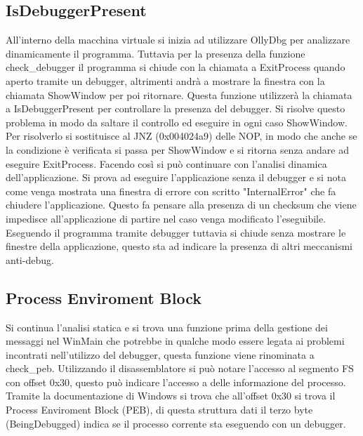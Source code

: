 \documentclass[a4paper,10pt]{article}
\begin{document}
\subsection{IsDebuggerPresent}
All'interno della macchina virtuale si inizia ad utilizzare OllyDbg per analizzare dinamicamente il programma. Tuttavia per la presenza della funzione check\_debugger il programma si chiude con la chiamata a ExitProcess quando aperto tramite un debugger, altrimenti andrà a mostrare la finestra con la chiamata ShowWindow per poi ritornare.  Questa funzione utilizzerà la chiamata a IsDebuggerPresent per controllare la presenza del debugger.
Si risolve questo problema in modo da saltare il controllo ed eseguire in ogni caso ShowWindow. Per risolverlo si sostituisce al JNZ (0x004024a9) delle NOP, in modo che anche se la condizione è verificata si passa per ShowWindow e si ritorna senza andare ad eseguire ExitProcess.
 Facendo così si può continuare con l'analisi dinamica dell'applicazione. Si prova ad eseguire l'applicazione senza il debugger e si nota come venga mostrata una finestra di errore con scritto "InternalError" che fa chiudere l'applicazione. Questo fa pensare alla presenza di un checksum che viene impedisce all'applicazione di partire nel caso venga modificato l'eseguibile.  Eseguendo il programma tramite debugger tuttavia si chiude senza mostrare le finestre della applicazione, questo sta ad indicare la presenza di altri meccanismi anti-debug. 

\subsection{Process Enviroment Block}
Si continua l'analisi statica e si trova una funzione prima della gestione dei messaggi nel WinMain che potrebbe in qualche modo essere legata ai problemi incontrati nell'utilizzo del debugger, questa funzione viene rinominata a check\_peb. Utilizzando il disassemblatore si può notare l'accesso al segmento FS con offset 0x30, questo può indicare l'accesso a delle informazione del processo. Tramite la documentazione di Windows si trova che all'offset 0x30 si trova il Process Enviroment Block (PEB), di questa struttura dati il terzo byte (BeingDebugged) indica se il processo corrente sta eseguendo con un debugger.
\end{document}
